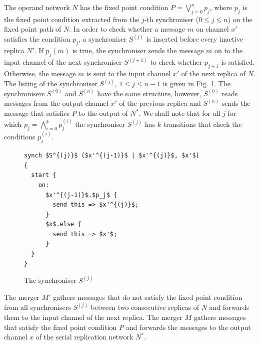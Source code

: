 The operand network $N$ has the fixed point condition $P = \bigvee_{j=0}^{n} p_j$, where $p_j$ is the fixed point condition extracted from the $j$-th synchroniser ($0 \leq j \leq n$) on the fixed point path of $N$. In order to check whether a message $m$ on channel $x'$ satisfies the condition $p_j$, a synchroniser $S^{(j)}$ is inserted before every inactive replica $N'$. If $p_{j}(m)$ is true, the synchroniser sends the message $m$ on to the input channel of the next synchroniser $S^{(j+1)}$ to check whether $p_{j+1}$ is satisfied. Otherwise, the message $m$ is sent to the input channel $x'$ of the next replica of $N$. The listing of the synchroniser $S^{(j)}$, $1 \leq j \leq n-1$ is given in Fig. \ref{ffp:synch_filt}. The synchronisers $S^{(0)}$ and $S^{(n)}$ have the same structure, however, $S^{(0)}$ reads messages from the output channel $x'$ of the previous replica and $S^{(n)}$ sends the message that satisfies $P$ to the output of $N^{*}$. We shall note that for all $j$ for which $p_j = \bigwedge_{i=0}^{k}p^{(i)}_j$ the synchroniser $S^{(j)}$ has $k$ transitions that check the conditions $p^{(i)}_j$.
\begin{figure}[h!]
\begin{lstlisting}[frame=single,mathescape]
synch $S^{(j)}$ ($x'^{(j-1)}$ | $x'^{(j)}$, $x'$)
{
  start {
    on:
      $x'^{(j-1)}$.$p_j$ {
        send this => $x'^{(j)}$;
      }
      $x$.else {
        send this => $x'$;
      }
  }
}
\end{lstlisting}
\caption{The synchroniser $S^{(j)}$}
\label{ffp:synch_filt}
\end{figure}

The merger $M'$ gathers messages that do not satisfy the fixed point condition from all synchronisers $S^{(j)}$ between two consecutive replicas of $N$ and forwards them to the input channel of the next replica. The merger $M$ gathers messages that satisfy the fixed point condition $P$ and forwards the messages to the output channel $x$ of the serial replication network $N^{*}$.


